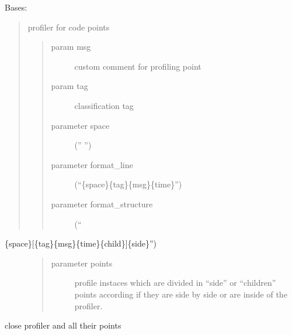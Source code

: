 \documentclass[letterpaper,10pt,english]{sphinxmanual}
\begin{document}
\begin{fulllineitems}
\label{RRtoolbox.lib:RRtoolbox.lib.root.Profiler}
Bases: 
\begin{quote}

profiler for code points
\begin{quote}\begin{description}
\item[{param msg}] \leavevmode
custom comment for profiling point

\item[{param tag}] \leavevmode
classification tag

\item[{parameter space}] \leavevmode
('' '')

\item[{parameter format\_line}] \leavevmode
(``\{space\}\{tag\}\{msg\}\{time\}'')

\item[{parameter format\_structure}] \leavevmode
(``

\end{description}\end{quote}
\end{quote}
\begin{description}
\item[{\{space\}{[}\{tag\}\{msg\}\{time\}\{child\}{]}\{side\}'')}] \leavevmode\begin{quote}\begin{description}
\item[{parameter points}] \leavevmode
profile instaces which are divided in ``side'' or ``children'' points
according if they are side by side or are inside of the profiler.

\end{description}\end{quote}

\end{description}

\begin{fulllineitems}
\label{RRtoolbox.lib:RRtoolbox.lib.root.Profiler.close}
close profiler and all their points

\end{fulllineitems}



\end{fulllineitems}
\end{document}
